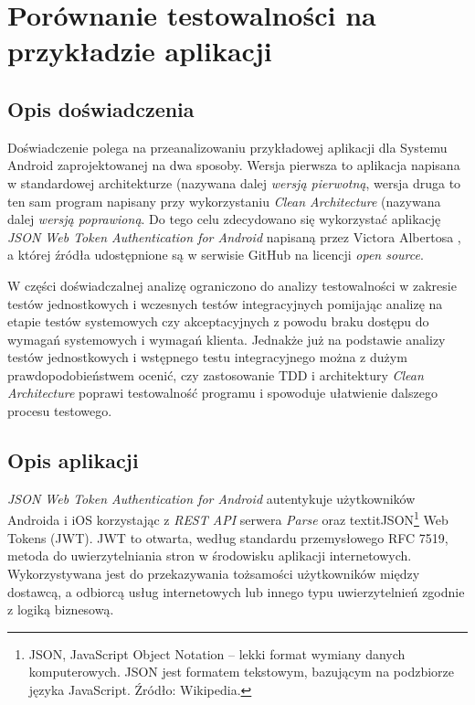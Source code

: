 \chapter{Porównanie testowalności na przykładzie aplikacji}
\label{analiza_testow}

\section{Opis doświadczenia}
Doświadczenie polega na przeanalizowaniu przykładowej aplikacji dla Systemu Android zaprojektowanej na dwa sposoby. Wersja pierwsza to aplikacja napisana w standardowej architekturze (nazywana dalej \textit{wersją pierwotną}, wersja druga to ten sam program napisany przy wykorzystaniu \textit{Clean Architecture} (nazywana dalej \textit{wersją poprawioną}. Do tego celu zdecydowano się wykorzystać
aplikację \textit{JSON Web Token Authentication for Android} napisaną przez Victora Albertosa \cite{website:victor:aplication} , a której źródła udostępnione są w serwisie GitHub na licencji \textit{open source}.

W części doświadczalnej analizę ograniczono do analizy testowalności w zakresie testów jednostkowych i wczesnych testów integracyjnych pomijając analizę na etapie testów systemowych czy akceptacyjnych z powodu braku dostępu do wymagań systemowych i wymagań klienta. Jednakże już na podstawie analizy testów jednostkowych i wstępnego testu integracyjnego można z dużym prawdopodobieństwem ocenić, czy zastosowanie TDD i architektury \textit{Clean Architecture} poprawi testowalność programu i spowoduje ułatwienie dalszego procesu testowego.

\section{Opis aplikacji}
\textit{JSON Web Token Authentication for Android} autentykuje użytkowników Androida i iOS korzystając z \textit{REST API} serwera \textit{Parse} oraz textit{JSON\footnote{JSON, JavaScript Object Notation – lekki format wymiany danych komputerowych. JSON jest formatem tekstowym, bazującym na podzbiorze języka JavaScript. Źródło: Wikipedia.} Web Tokens (JWT)}. JWT to otwarta, według standardu przemysłowego RFC 7519\cite{website:jwt:rfc7519}, metoda do uwierzytelniania stron w środowisku aplikacji internetowych. Wykorzystywana jest do przekazywania tożsamości użytkowników między dostawcą, a odbiorcą usług internetowych lub innego typu uwierzytelnień zgodnie z logiką biznesową. 

